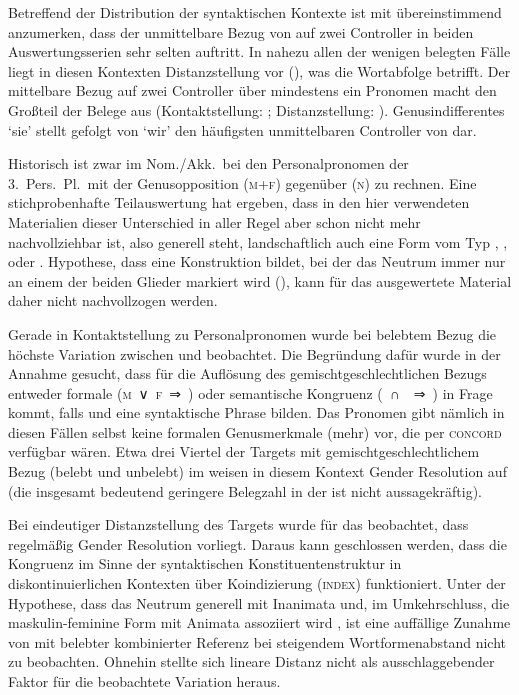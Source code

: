 Betreffend der Distribution der syntaktischen Kontexte ist mit \citet[624,
Abb.~P~179]{ksw2} übereinstimmend anzumerken, dass der unmittelbare Bezug von
 auf zwei Controller in beiden Auswertungsserien sehr selten
auftritt. In nahezu allen der wenigen belegten Fälle liegt in diesen Kontexten
Distanzstellung vor (), was die Wortabfolge
betrifft. Der mittelbare Bezug auf zwei Controller über mindestens ein Pronomen
macht den Großteil der Belege aus (Kontaktstellung: ;
Distanzstellung: ). Genus\-indifferentes
 `sie' stellt gefolgt von  `wir' den häufigsten
unmittelbaren Controller von  dar.

Historisch ist zwar im Nom./Akk.\ bei den Personalpronomen der 3.~Pers.\ Pl.\
mit der Genus\-opposition  (\textsc{m+f}) gegenüber 
(\textsc{n}) zu rechnen. Eine stichprobenhafte Teilauswertung hat ergeben, dass
in den hier verwendeten Materialien dieser Unterschied in aller Regel aber
schon nicht mehr nachvollziehbar ist, also generell \norm{si} steht,
landschaftlich auch eine Form vom Typ
,
,
 oder
\autocites[vgl.][213--214]{paul2007}[369, 390--397]{ksw2}[482--483]{wmu1}.
\posscite[99]{askedal1973} Hypothese, dass \norm{si bėide} eine
Konstruktion bildet, bei der das Neutrum immer nur an einem der beiden Glieder
markiert wird (\q{Monoflexion}), kann für das ausgewertete Material daher
nicht nachvollzogen werden.

Gerade in Kontaktstellung zu Personalpronomen wurde bei belebtem Bezug die
höchste Variation zwischen \norm{bėide} und \norm{bėidiu} beobachtet. Die
Begründung dafür wurde in der Annahme gesucht, dass für die Auflösung des
gemischtgeschlechtlichen Bezugs entweder formale
(\textsc{m}~∨~\textsc{f}~⇒~) oder semantische Kongruenz
(\SM{}~∩~\SF{}~⇒~\norm{-iu}) in Frage kommt, falls \norm{si} und 
eine syntaktische Phrase bilden. Das Pronomen gibt nämlich in diesen Fällen
selbst keine formalen Genus\-merk\-male (mehr) vor, die per \textsc{concord}
verfügbar wären. Etwa drei Viertel der Targets mit gemischtgeschlechtlichem
Bezug (belebt und unbelebt) im \CAO{} weisen in diesem Kontext Gender
Resolution auf (die insgesamt bedeutend geringere Belegzahl in der \KC{} ist
nicht aussagekräftig).

Bei eindeutiger Distanzstellung des Targets wurde für das \CAO{} beobachtet,
dass regel\-mäßig Gender Re\-solu\-tion vorliegt. Daraus kann geschlossen
werden, dass die Kongruenz im Sinne der syntaktischen Konstituentenstruktur in
diskontinuierlichen Kontexten über Koindizierung (\textsc{index}) funktioniert.
Unter der Hypothese, dass das Neutrum generell mit Inanimata und, im
Umkehrschluss, die maskulin-feminine Form mit Animata assoziiert wird
\autocite[243--245]{askedal1973}, ist eine auffällige Zunahme von 
mit belebter kombinierter Referenz bei steigendem Wortformenabstand nicht zu
beobachten. Ohnehin stellte sich lineare Distanz nicht als ausschlaggebender
Faktor für die beob\-ach\-tete Variation heraus.

